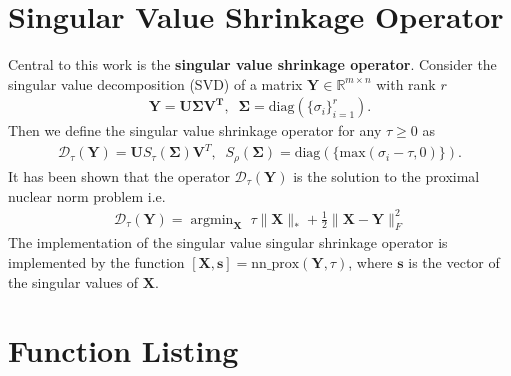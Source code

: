 \documentclass{article}
\DeclareMathOperator*{\argmin}{\mathrm{argmin}}
\begin{document}
\section{Singular Value Shrinkage Operator}

Central to this work is the {\bf{singular value shrinkage operator}}. Consider the singular value decomposition (SVD) of a matrix $\mathbf Y \in \mathbb R^{m \times n}$ with rank $r$
\begin{align}
\mathbf Y = \mathbf{U \Sigma V^T}, \;\; \mathbf \Sigma = \text{diag}(\{\sigma_i\}_{i=1}^r).
\end{align}
Then we define the singular value shrinkage operator for any $\tau \geq 0$ as
\begin{align}
\mathcal D_{\tau}(\mathbf Y) = \mathbf U S_{\tau}(\mathbf \Sigma) \mathbf V^T, \;\; S_{\rho}(\mathbf \Sigma) = \text{diag}(\{\text{max}(\sigma_i - \tau, 0)\}).
\end{align}
It has been shown \cite{cai2010singular} that the operator $\mathcal D_{\tau}(\mathbf Y)$ is the solution to the proximal nuclear norm problem i.e.
\begin{align}
\mathcal D_{\tau}(\mathbf Y) = \argmin_{\mathbf X} \; \tau \| \mathbf X \|_* + \frac{1}{2} \| \mathbf{X - Y} \|_F^2
\end{align}
The implementation of the singular value singular shrinkage operator is implemented by the function $[ \mathbf X, \mathbf s ] = \text{nn\_prox}( \mathbf Y, \tau )$, where $\mathbf s$ is the vector of the singular values of $\mathbf X$.

\newpage
\section{Function Listing}
\end{document}
